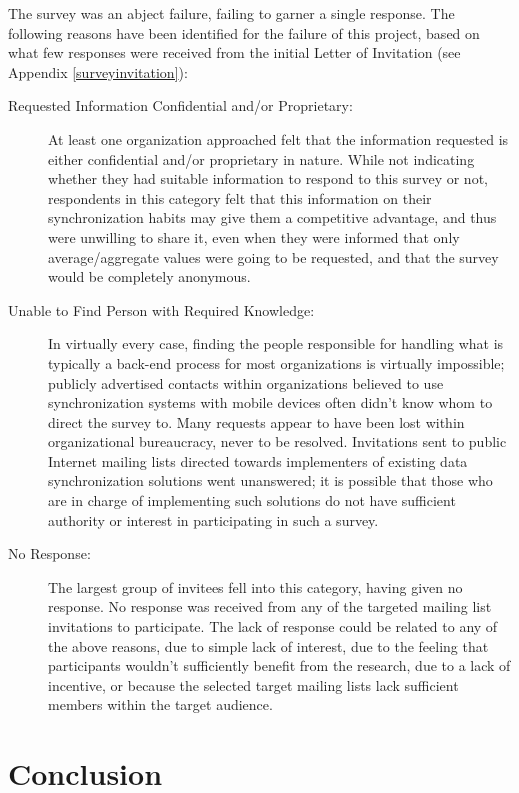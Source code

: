 The survey was an abject failure, failing to garner a single response.  The following reasons have been identified for the failure of this project, based on what few responses were received from the initial Letter of Invitation (see Appendix \ref{surveyinvitation}):
\begin{description}
\item[Requested Information Confidential and/or Proprietary:] At least one organization approached felt that the information requested is either confidential and/or proprietary in nature.  While not indicating whether they had suitable information to respond to this survey or not, respondents in this category felt that this information on their synchronization habits may give them a competitive advantage, and thus were unwilling to share it, even when they were informed that only average/aggregate values were going to be requested, and that the survey would be completely anonymous.
\item[Unable to Find Person with Required Knowledge:] In virtually every case, finding the people responsible for handling what is typically a back-end process for most organizations is virtually impossible; publicly advertised contacts within organizations believed to use synchronization systems with mobile devices often didn't know whom to direct the survey to.  Many requests appear to have been lost within organizational bureaucracy, never to be resolved.  Invitations sent to public Internet mailing lists directed towards implementers of existing data synchronization solutions went unanswered; it is possible that those who are in charge of implementing such solutions do not have sufficient authority or interest in participating in such a survey.
\item[No Response:] The largest group of invitees fell into this category, having given no response.  No response was received from any of the targeted mailing list invitations to participate.  The lack of response could be related to any of the above reasons, due to simple lack of interest, due to the feeling that participants wouldn't sufficiently benefit from the research, due to a lack of incentive, or because the selected target mailing lists lack sufficient members within the target audience.
\end{description}

\section{Conclusion}

